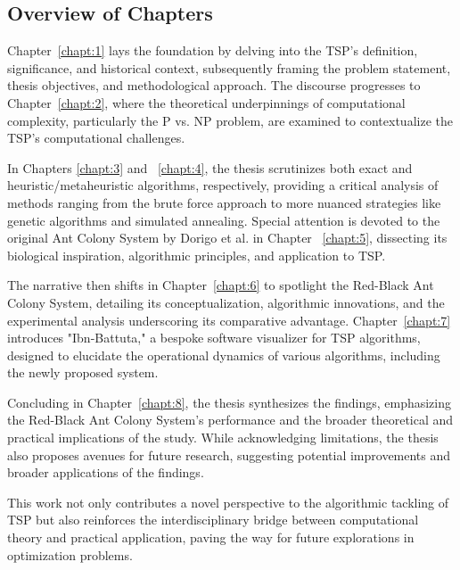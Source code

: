 \subsection{Overview of Chapters}

Chapter~\ref{chapt:1} lays the foundation by delving into the TSP's definition, significance, and historical context, subsequently framing the problem statement, thesis objectives, and methodological approach. The discourse progresses to Chapter~\ref{chapt:2}, where the theoretical underpinnings of computational complexity, particularly the P vs. NP problem, are examined to contextualize the TSP's computational challenges.

In Chapters \ref{chapt:3} and ~\ref{chapt:4}, the thesis scrutinizes both exact and heuristic/metaheuristic algorithms, respectively, providing a critical analysis of methods ranging from the brute force approach to more nuanced strategies like genetic algorithms and simulated annealing. Special attention is devoted to the original Ant Colony System by Dorigo et al. in Chapter ~\ref{chapt:5}, dissecting its biological inspiration, algorithmic principles, and application to TSP.

The narrative then shifts in Chapter~\ref{chapt:6} to spotlight the Red-Black Ant Colony System, detailing its conceptualization, algorithmic innovations, and the experimental analysis underscoring its comparative advantage. Chapter~\ref{chapt:7} introduces "Ibn-Battuta," a bespoke software visualizer for TSP algorithms, designed to elucidate the operational dynamics of various algorithms, including the newly proposed system.

Concluding in Chapter~\ref{chapt:8}, the thesis synthesizes the findings, emphasizing the Red-Black Ant Colony System's performance and the broader theoretical and practical implications of the study. While acknowledging limitations, the thesis also proposes avenues for future research, suggesting potential improvements and broader applications of the findings.

This work not only contributes a novel perspective to the algorithmic tackling of TSP but also reinforces the interdisciplinary bridge between computational theory and practical application, paving the way for future explorations in optimization problems.